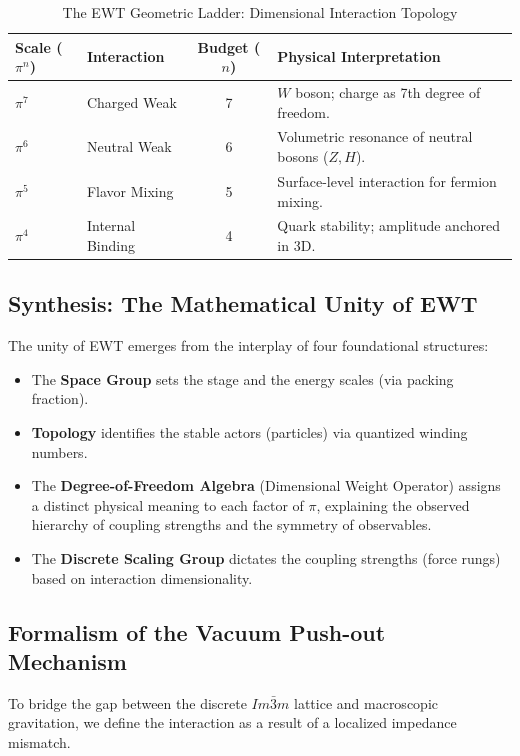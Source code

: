 \documentclass[10pt,a4paper]{article}
\begin{document}
\begin{table}[h]
	\centering
	\caption{The EWT Geometric Ladder: Dimensional Interaction Topology}
	\label{tab:dimensional_ladder_origin}
	\begin{tabularx}{\textwidth}{l l c l}
		\toprule
		\textbf{Scale} ($\pi^n$) & \textbf{Interaction} & \textbf{Budget ($n$)} & \textbf{Physical Interpretation} \\
		\midrule
		$\pi^7$ & Charged Weak & 7 & $W$ boson; charge as 7th degree of freedom. \\
		$\pi^6$ & Neutral Weak & 6 & Volumetric resonance of neutral bosons ($Z, H$). \\
		$\pi^5$ & Flavor Mixing & 5 & Surface-level interaction for fermion mixing. \\
		$\pi^4$ & Internal Binding & 4 & Quark stability; amplitude anchored in 3D. \\
		\bottomrule
	\end{tabularx}
\end{table}

\subsection{Synthesis: The Mathematical Unity of EWT}
The unity of EWT emerges from the interplay of four foundational structures:
\begin{itemize}
	\item The \textbf{Space Group} sets the stage and the energy scales (via packing fraction).
	\item \textbf{Topology} identifies the stable actors (particles) via quantized winding numbers.
	\item The \textbf{Degree-of-Freedom Algebra} (Dimensional Weight Operator) assigns a distinct physical meaning to each factor of $\pi$, explaining the observed hierarchy of coupling strengths and the symmetry of observables.
	\item The \textbf{Discrete Scaling Group} dictates the coupling strengths (force rungs) based on interaction dimensionality.
\end{itemize}

\subsection{Formalism of the Vacuum Push-out Mechanism}

To bridge the gap between the discrete $Im\bar{3}m$ lattice and macroscopic gravitation, we define the interaction as a result of a localized impedance mismatch.
\end{document}
